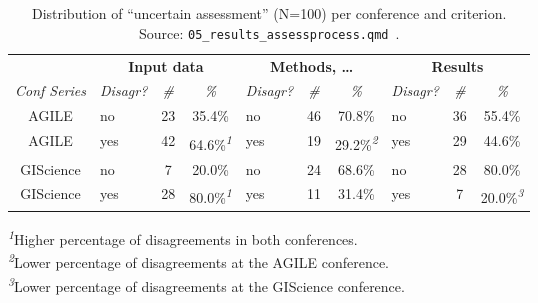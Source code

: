 \documentclass{josis}
\begin{document}
\begin{table}
\centering
\begin{tabular*}{\linewidth}{@{\extracolsep{\fill}}clcclcclcc}
\toprule
 & \multicolumn{3}{c}{\textbf{Input data}} & \multicolumn{3}{c}{\textbf{Methods, \ldots{}}} & \multicolumn{3}{c}{\textbf{Results}} \\ 
\cmidrule(lr){2-4} \cmidrule(lr){5-7} \cmidrule(lr){8-10}
\emph{Conf Series} & \emph{Disagr?} & \emph{\#} & \emph{\%} & \emph{Disagr?} & \emph{\#} & \emph{\%} & \emph{Disagr?} & \emph{\#} & \emph{\%} \\ 
\midrule\addlinespace[2.5pt]
AGILE & no & 23 & 35.4\% & no & 46 & 70.8\% & no & 36 & 55.4\% \\ 
{AGILE} & {yes} & {42} & {64.6\%}\textsuperscript{\textit{1}} & {yes} & {19} & {29.2\%}\textsuperscript{\textit{2}} & {yes} & {29} & {44.6\%} \\ 
GIScience & no & 7 & 20.0\% & no & 24 & 68.6\% & no & 28 & 80.0\% \\ 
GIScience & yes & 28 & 80.0\%\textsuperscript{\textit{1}} & yes & 11 & 31.4\% & yes & 7 & 20.0\%\textsuperscript{\textit{3}} \\ 
\bottomrule
\end{tabular*}
\begin{minipage}{\linewidth}
\textsuperscript{\textit{1}}Higher percentage of disagreements in both conferences.\\
\textsuperscript{\textit{2}}Lower percentage of disagreements at the AGILE conference.\\
\textsuperscript{\textit{3}}Lower percentage of disagreements at the GIScience conference.\\
\end{minipage}
\caption{Distribution of ``uncertain assessment'' (N=100) per conference and criterion. Source: \texttt{05\_results\_assessprocess.qmd}~\cite{data}.}\label{tbl:uncertain_disgr}
\end{table}
\end{document}
